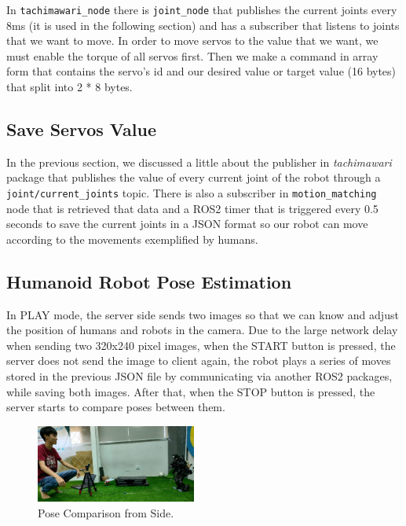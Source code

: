   In \verb|tachimawari_node| there is \verb|joint_node| that publishes the current joints every 8ms (it is used in the following section) and has a subscriber that listens to joints that we want to move. 
  In order to move servos to the value that we want, we must enable the torque of all servos first. Then we make a command in array form that contains the servo's id and our desired value or target value (16 bytes) that split into 2 * 8 bytes.

\subsection{Save Servos Value}
\label{subsec:save-servo-value}

In the previous section, we discussed a little about the publisher in \emph{tachimawari} package that publishes the value of every current joint of the robot through a \verb|joint/current_joints| topic.
There is also a subscriber in \verb|motion_matching| node that is retrieved that data and a ROS2 timer that is triggered every 0.5 seconds to save the current joints in a JSON format so our robot can move according to the movements exemplified by humans.


\subsection{Humanoid Robot Pose Estimation}
\label{subsec:humanoid-robot-pose-estimation}

In PLAY mode, the server side sends two images so that we can know and adjust the position of humans and robots in the camera. Due to the large network delay when sending two 320x240 pixel images, when the START button is pressed,
the server does not send the image to client again, the robot plays a series of moves stored in the previous JSON file by communicating via another ROS2 packages, while saving both images. After that, when the STOP button is pressed, the server starts to compare poses between them.
\begin{figure}[ht]
  \centering
  \includegraphics[width=0.47\textwidth]{gambar/pose-comparison.jpeg}
  \caption{Pose Comparison from Side.}
  \label{fig:pose-comparison-side}
\end{figure}

